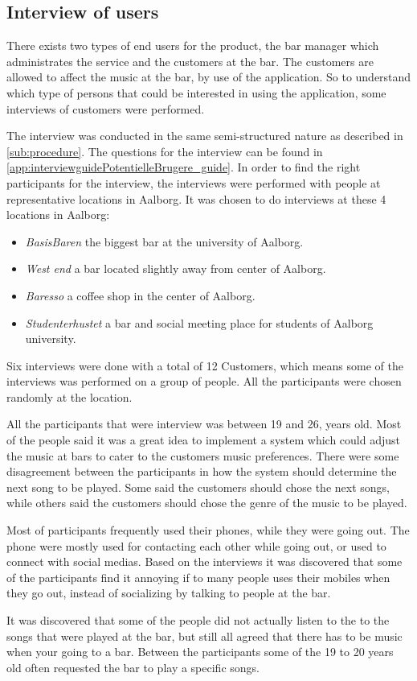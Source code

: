 \subsection{Interview of users}
\label{userInterviews}

There exists two types of end users for the product, the bar manager which administrates the service and the customers at the bar. The customers are allowed to affect the music at the bar, by use of the application. So to understand which type of persons that could be interested in using the application, some interviews of customers were performed.

The interview was conducted in the same semi-structured nature as described in \cref{sub:procedure}. The questions for the interview can be found in \cref{app:interviewguidePotentielleBrugere_guide}. In order to find the right participants for the interview, the interviews were performed with people at representative locations in Aalborg. It was chosen to do interviews at these 4 locations in Aalborg:

\begin{itemize}
    \item \emph{BasisBaren} the biggest bar at the university of Aalborg.
    \item \emph{West end} a bar located slightly away from center of Aalborg.
    \item \emph{Baresso} a coffee shop in the center of Aalborg.
    \item \emph{Studenterhustet} a bar and social meeting place for students of Aalborg university.
\end{itemize}

Six interviews were done with a total of 12 Customers, which means some of the interviews was performed on a group of people. All the participants were chosen randomly at the location. 

All the participants that were interview was between 19 and 26, years old. Most of the people said it was a great idea to implement a system which could adjust the music at bars to cater to the customers music preferences. There were some disagreement between the participants in how the system should determine the next song to be played. Some said the customers should chose the next songs, while others said the customers should chose the genre of the music to be played.

Most of participants frequently used their phones, while they were going out. The phone were mostly used for contacting each other while going out, or used to connect with social medias. 
Based on the interviews it was discovered that some of the participants find it annoying if to many people uses their mobiles when they go out, instead of socializing by talking to people at the bar.  

It was discovered that some of the people did not actually listen to the to the songs that were played at the bar, but still all agreed that there has to be music when your going to a bar. Between the participants some of the 19 to 20 years old often requested the bar to play a specific songs. 
